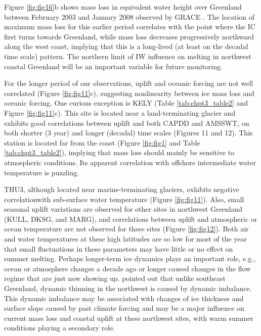 Figure \ref{fig:fig16}b shows mass loss in equivalent water
height over Greenland between February 2003 and
January 2008 observed by GRACE \cite[]{wouters2008grace}. The location of maximum mass loss for
this earlier period correlates with the point where the
IC first turns towards Greenland, while mass loss decreases
progressively northward along the west coast,
implying that this is a long-lived (at least on the
decadal time scale) pattern. The northern limit of IW
influence on melting in northwest coastal Greenland
will be an important variable for future monitoring.

For the longer period of our observations, uplift
and oceanic forcing are not well correlated
(Figure \ref{fig:fig11}c), suggesting nonlinearity between ice
mass loss and oceanic forcing. One curious exception
is KELY (Table \ref{tab:chpt3_table2} and Figure \ref{fig:fig11}c). This site is located
near a land-terminating glacier and exhibits good
correlations between uplift and both CAPDD and
AMSSWT, on both shorter (3 year) and longer
(decadal) time scales (Figures 11 and 12). This
station is located far from the coast (Figure \ref{fig:fig1} and
Table \ref{tab:chpt3_table2}), implying that mass loss should mainly
be sensitive to atmospheric conditions. Its apparent
correlation with offshore intermediate water
temperature is puzzling.

THU3, although located near marine-terminating
glaciers, exhibits negative correlationwith sub-surface
water temperature (Figure \ref{fig:fig11}). Also, small seasonal
uplift variations are observed for other sites in
northwest Greenland (KULL, DKSG, and MARG),
and correlations between uplift and atmospheric or
ocean temperature are not observed for these sites
(Figure \ref{fig:fig12}). Both air and water temperatures at these
high latitudes are so low for most of the year that
small fluctuations in these parameters may have little
or no effect on summer melting. Perhaps longer-term
ice dynamics plays an important role, e.g., ocean or
atmosphere changes a decade ago or longer caused
changes in the flow regime that are just now
showing up. \cite{pritchard2009extensive} pointed out that
unlike southeast Greenland, dynamic thinning in
the northwest is caused by dynamic imbalance. This
dynamic imbalance may be associated with changes
of ice thickness and surface slope \cite[]{huybrechts1999dynamic} caused by past climate forcing and
may be a major influence on current mass loss
and coastal uplift at these northwest sites, with
warm summer conditions playing a secondary role.

